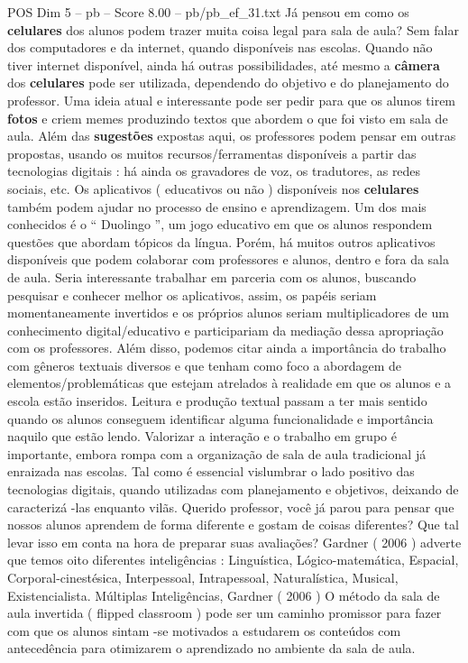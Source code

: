 \begin{textsample}{POS Dim 5 – pb – Score 8.00 – pb/pb\_ef\_31.txt}
Já pensou em como os \textbf{celulares} dos alunos podem trazer muita coisa legal para sala de aula?
Sem falar dos computadores e da internet, quando disponíveis nas escolas.
Quando não tiver internet disponível, ainda há outras possibilidades, até mesmo a \textbf{câmera} dos \textbf{celulares} pode ser utilizada, dependendo do objetivo e do planejamento do professor.
Uma ideia atual e interessante pode ser pedir para que os alunos tirem \textbf{fotos} e criem memes produzindo textos que abordem o que foi visto em sala de aula.
Além das \textbf{sugestões} expostas aqui, os professores podem pensar em outras propostas, usando os muitos recursos/ferramentas disponíveis a partir das tecnologias digitais : há ainda os gravadores de voz, os tradutores, as redes sociais, etc.
Os aplicativos ( educativos ou não ) disponíveis nos \textbf{celulares} também podem ajudar no processo de ensino e aprendizagem.
Um dos mais conhecidos é o “ Duolingo ”, um jogo educativo em que os alunos respondem questões que abordam tópicos da língua.
Porém, há muitos outros aplicativos disponíveis que podem colaborar com professores e alunos, dentro e fora da sala de aula.
Seria interessante trabalhar em parceria com os alunos, buscando pesquisar e conhecer melhor os aplicativos, assim, os papéis seriam momentaneamente invertidos e os próprios alunos seriam multiplicadores de um conhecimento digital/educativo e participariam da mediação dessa apropriação com os professores.
Além disso, podemos citar ainda a importância do trabalho com gêneros textuais diversos e que tenham como foco a abordagem de elementos/problemáticas que estejam atrelados à realidade em que os alunos e a escola estão inseridos.
Leitura e produção textual passam a ter mais sentido quando os alunos conseguem identificar alguma funcionalidade e importância naquilo que estão lendo.
Valorizar a interação e o trabalho em grupo é importante, embora rompa com a organização de sala de aula tradicional já enraizada nas escolas.
Tal como é essencial vislumbrar o lado positivo das tecnologias digitais, quando utilizadas com planejamento e objetivos, deixando de caracterizá -las enquanto vilãs.
Querido professor, você já parou para pensar que nossos alunos aprendem de forma diferente e gostam de coisas diferentes?
Que tal levar isso em conta na hora de preparar suas avaliações?
Gardner ( 2006 ) adverte que temos oito diferentes inteligências : Linguística, Lógico-matemática, Espacial, Corporal-cinestésica, Interpessoal, Intrapessoal, Naturalística, Musical, Existencialista.
Múltiplas Inteligências, Gardner ( 2006 ) O método da sala de aula invertida ( flipped classroom ) pode ser um caminho promissor para fazer com que os alunos sintam -se motivados a estudarem os conteúdos com antecedência para otimizarem o aprendizado no ambiente da sala de aula.

\end{textsample}
